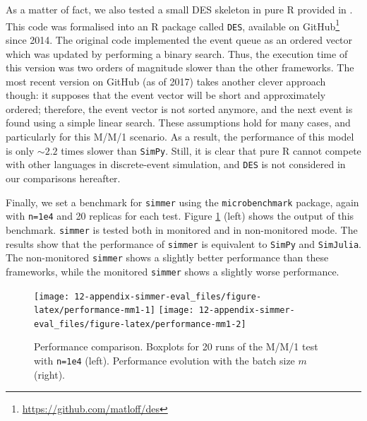 \documentclass[twoside,nohyper]{tufte-book}
\begin{document}
As a matter of fact, we also tested a small DES skeleton in pure R provided in \citet[s. 7.8.3]{Matloff:2011:ARP:2090080}. This code was formalised into an R package called \texttt{DES}, available on GitHub\footnote{\url{https://github.com/matloff/des}} since 2014. The original code implemented the event queue as an ordered vector which was updated by performing a binary search. Thus, the execution time of this version was two orders of magnitude slower than the other frameworks. The most recent version on GitHub (as of 2017) takes another clever approach though: it supposes that the event vector will be short and approximately ordered; therefore, the event vector is not sorted anymore, and the next event is found using a simple linear search. These assumptions hold for many cases, and particularly for this M/M/1 scenario. As a result, the performance of this model is only \(\sim2.2\) times slower than \texttt{SimPy}. Still, it is clear that pure R cannot compete with other languages in discrete-event simulation, and \texttt{DES} is not considered in our comparisons hereafter.

Finally, we set a benchmark for \texttt{simmer} using the \texttt{microbenchmark} package\cite[0pt]{CRAN:microbenchmark}, again with \texttt{n=1e4} and 20 replicas for each test. Figure \ref{fig:performance-mm1} (left) shows the output of this benchmark. \texttt{simmer} is tested both in monitored and in non-monitored mode. The results show that the performance of \texttt{simmer} is equivalent to \texttt{SimPy} and \texttt{SimJulia}. The non-monitored \texttt{simmer} shows a slightly better performance than these frameworks, while the monitored \texttt{simmer} shows a slightly worse performance.



\begin{figure}

{\centering \texttt{[image: 12-appendix-simmer-eval\_files/figure-latex/performance-mm1-1]} \texttt{[image: 12-appendix-simmer-eval\_files/figure-latex/performance-mm1-2]} 

}

\caption[Performance comparison. Boxplots for 20 runs of the M/M/1 test with \texttt{n=1e4} (left). Performance evolution with the batch size \(m\) (right).]{Performance comparison. Boxplots for 20 runs of the M/M/1 test with \texttt{n=1e4} (left). Performance evolution with the batch size \(m\) (right).}\label{fig:performance-mm1}
\end{figure}
\end{document}
